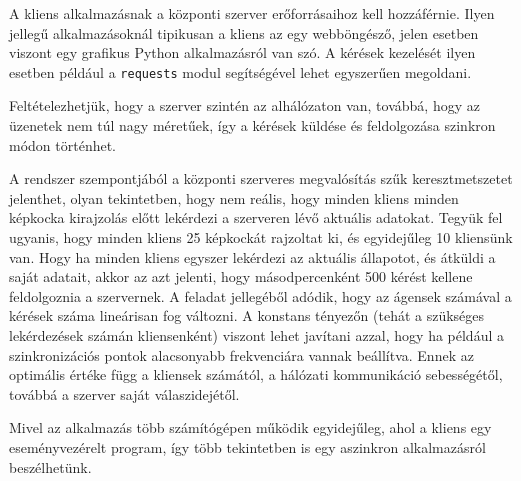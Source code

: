 
A kliens alkalmazásnak a központi szerver erőforrásaihoz kell hozzáférnie.
Ilyen jellegű alkalmazásoknál tipikusan a kliens az egy webböngésző, jelen esetben viszont egy grafikus Python alkalmazásról van szó.
A kérések kezelését ilyen esetben például a \texttt{requests} modul segítségével lehet egyszerűen megoldani.


Feltételezhetjük, hogy a szerver szintén az alhálózaton van, továbbá, hogy az üzenetek nem túl nagy méretűek, így a kérések küldése és feldolgozása szinkron módon történhet.


A rendszer szempontjából a központi szerveres megvalósítás szűk keresztmetszetet jelenthet, olyan tekintetben, hogy nem reális, hogy minden kliens minden képkocka kirajzolás előtt lekérdezi a szerveren lévő aktuális adatokat.
Tegyük fel ugyanis, hogy minden kliens 25 képkockát rajzoltat ki, és egyidejűleg 10 kliensünk van.
Hogy ha minden kliens egyszer lekérdezi az aktuális állapotot, és átküldi a saját adatait, akkor az azt jelenti, hogy másodpercenként 500 kérést kellene feldolgoznia a szervernek.
A feladat jellegéből adódik, hogy az ágensek számával a kérések száma lineárisan fog változni.
A konstans tényezőn (tehát a szükséges lekérdezések számán kliensenként) viszont lehet javítani azzal, hogy ha például a szinkronizációs pontok alacsonyabb frekvenciára vannak beállítva.
Ennek az optimális értéke függ a kliensek számától, a hálózati kommunikáció sebességétől, továbbá a szerver saját válaszidejétől.


Mivel az alkalmazás több számítógépen működik egyidejűleg, ahol a kliens egy eseményvezérelt program, így több tekintetben is egy aszinkron alkalmazásról beszélhetünk.



